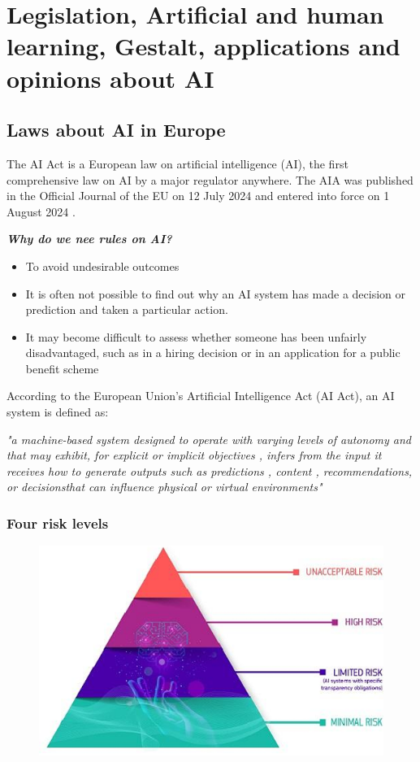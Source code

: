 
\chapter{Legislation, Artificial and human learning, Gestalt, applications and opinions about AI}
\section{Laws about AI in Europe}
\noindent The AI Act is a European law on artificial intelligence (AI), the first comprehensive law on AI by a major regulator anywhere. 
The AIA was published in the Official Journal of the EU on 12 July 2024 and entered into force on 1 August 2024 . 


\noindent \textbf{\textit{Why do we nee rules on AI?}}
\begin{itemize}
    \item To avoid undesirable outcomes
    \item It is often not possible to find out why an AI system has made a decision or prediction and taken a particular action. 
    \item It may become difficult to assess whether someone has been unfairly disadvantaged, such as in a hiring decision or in an application for a public benefit scheme
\end{itemize}

According to the European Union's Artificial Intelligence Act (AI Act), an AI system is defined as: 
\begin{center}
    \textit{"a machine-based system designed to operate with varying levels of autonomy and that may exhibit, for explicit or implicit objectives , infers from the input it receives how to generate outputs such as predictions , content , recommendations, or decisionsthat can influence physical or virtual environments"}
\end{center}


\subsection{Four risk levels}
\begin{figure}[H]
    \centering
    \includegraphics[width=0.6\linewidth]{02/images/piramide.png}
\end{figure}

